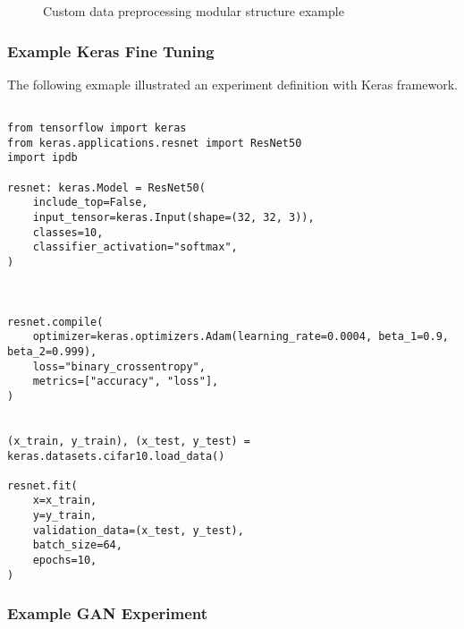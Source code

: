 \begin{figure}[H]
\centering
{}
\caption{
Custom data preprocessing modular structure example
}
\label{customdata}
\end{figure}

\subsubsection{Example Keras Fine Tuning}

The following exmaple illustrated an experiment definition with Keras framework.

\begin{verbatim}

from tensorflow import keras
from keras.applications.resnet import ResNet50
import ipdb 

resnet: keras.Model = ResNet50(
    include_top=False,
    input_tensor=keras.Input(shape=(32, 32, 3)),
    classes=10,
    classifier_activation="softmax",
)



resnet.compile(
    optimizer=keras.optimizers.Adam(learning_rate=0.0004, beta_1=0.9, beta_2=0.999),
    loss="binary_crossentropy",
    metrics=["accuracy", "loss"],
)


(x_train, y_train), (x_test, y_test) = keras.datasets.cifar10.load_data()

resnet.fit(
    x=x_train,
    y=y_train,
    validation_data=(x_test, y_test),
    batch_size=64,
    epochs=10,
)

\end{verbatim}



\subsubsection{Example GAN Experiment}

